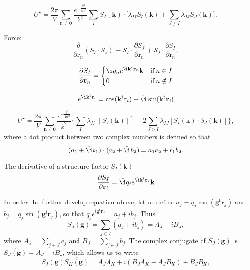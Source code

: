 \documentclass[11pt]{article}
\newcommand{\vt}[1]{\boldsymbol{\mathbf{#1}}}           %
\newcommand{\tr}[1]{#1^\text{t}}                        %
\newcommand{\im}{\hat{\i}}                              %
\begin{document}
\begin{equation*}
U^\star = \frac{2\pi}{V}\sum_{\vt n \neq \vt 0} \frac{e^{-\frac{k^2}{4\alpha^2}}}{k^2} \sum_I S_I(\vt k) \cdot \Bigg[
\lambda_{II}S_I(\vt k) + \sum_{J \neq I} \lambda_{IJ} S_J(\vt k)\Bigg],
\end{equation*}



Force:
\begin{equation*}
\frac{\partial}{\partial \vt r_n}(S_I \cdot S_J) = S_I \cdot \frac{\partial S_J}{\partial \vt r_n} + S_J \cdot \frac{\partial S_I}{\partial \vt r_n},
\end{equation*}

\begin{equation*}
\frac{\partial S_I}{\partial \vt r_n} = \begin{cases}
\im q_n e^{\im \tr{\vt k}{\vt r}_n}{\vt k} & \text{if} \; n \in I \\
0 & \text{if} \; n \notin I
\end{cases}
\end{equation*}

\begin{equation*}
e^{\im \tr{\vt k}{\vt r}_i} = \cos(\tr{\vt k}{\vt r}_i) + \im \sin(\tr{\vt k}{\vt r}_i)
\end{equation*}



\begin{equation}
\label{eq:U_long_by_types_1}
U^\star = \frac{2\pi}{V}\sum_{\vt n \neq \vt 0} \frac{e^{-\frac{k^2}{4\alpha^2}}}{k^2} \Bigg\{ \sum_I \lambda_{II} \|S_I(\vt k)\|^2 + 2 \sum_{J>I} \lambda_{IJ} [S_I(\vt k) \cdot S_J(\vt k)] \Bigg\},
\end{equation}
where a dot product between two complex numbers is defined so that
\begin{equation*}
(a_1 + \im b_1)\cdot(a_2 + \im b_2) = a_1 a_2 + b_1 b_2.
\end{equation*}

The derivative of a structure factor $S_I(\vt k)$
\begin{equation*}
\frac{\partial S_I}{\partial \vt r_i} = \im q_i e^{\im \tr{\vt k}{\vt r}_i} \vt k
\end{equation*}


In order the further develop equation above, let us define $a_j = q_j \cos(\tr{\vt g}{\vt r}_j)$ and $b_j = q_j \sin(\tr{\vt g}{\vt r}_j)$, so that $q_j e^{i \tr{\vt g}{\vt r}_j} = a_j + ib_j$. Thus,
\begin{equation*}
S_J(\vt g) = \sum_{j \in J} (a_j + i b_j) = A_J + i B_J,
\end{equation*}
where $A_J = \sum_{j \in J} a_j$ and $B_J = \sum_{j \in J} b_j$. The complex conjugate of $S_J(\vt g)$ is $\overline{S_J(\vt g)} = A_J - i B_J$, which allows us to write
\begin{equation*}
S_J(\vt g)\overline{S_K(\vt g)} = A_J A_K + i(B_J A_K - A_J B_K) + B_J B_K,
\end{equation*}
\end{document}
